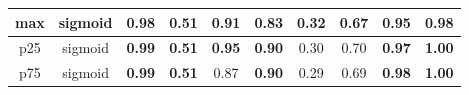 \begin{table*}[!b]
\begin{tabular}{|c|c|c|c|c|c|c|c|c|c|}
        \hline
                    max &         sigmoid &                \textbf{0.98} &             \textbf{0.51} &                   0.91 &                      0.83 &                        0.32 &                     0.67 &                  0.95 &          \textbf{0.98} \\
        \hline
                    p25 &         sigmoid &                \textbf{0.99} &             \textbf{0.51} &          \textbf{0.95} &             \textbf{0.90} &                        0.30 &                     0.70 &         \textbf{0.97} &          \textbf{1.00} \\
        \hline
                    p75 &         sigmoid &                \textbf{0.99} &             \textbf{0.51} &                   0.87 &             \textbf{0.90} &                        0.29 &                     0.69 &         \textbf{0.98} &          \textbf{1.00} \\
        \hline
    \end{tabular}   
\end{table*}
